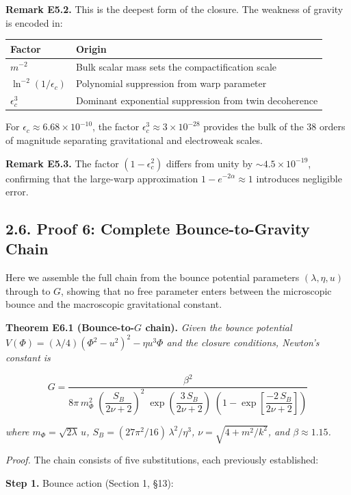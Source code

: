 \documentclass[
  11pt,
]{article}
\begin{document}
\textbf{Remark E5.2.} This is the deepest form of the closure. The
weakness of gravity is encoded in:

\begin{longtable}[]{@{}ll@{}}
\toprule
Factor & Origin\tabularnewline
\midrule
\endhead
\(m^{-2}\) & Bulk scalar mass sets the compactification
scale\tabularnewline
\(\ln^{-2}(1/\epsilon_c)\) & Polynomial suppression from warp
parameter\tabularnewline
\(\epsilon_c^3\) & Dominant exponential suppression from twin
decoherence\tabularnewline
\bottomrule
\end{longtable}

For \(\epsilon_c \approx 6.68 \times 10^{-10}\), the factor
\(\epsilon_c^3 \approx 3 \times 10^{-28}\) provides the bulk of the 38
orders of magnitude separating gravitational and electroweak scales.

\textbf{Remark E5.3.} The factor \((1 - \epsilon_c^2)\) differs from
unity by \(\sim 4.5 \times 10^{-19}\), confirming that the large-warp
approximation \(1 - e^{-2\alpha} \approx 1\) introduces negligible
error.

\bigskip

\hypertarget{proof-6-complete-bounce-to-gravity-chain}{%
\subsection{2.6. Proof 6: Complete Bounce-to-Gravity
Chain}\label{proof-6-complete-bounce-to-gravity-chain}}

Here we assemble the full chain from the bounce potential parameters
\((\lambda, \eta, u)\) through to \(G\), showing that no free parameter
enters between the microscopic bounce and the macroscopic gravitational
constant.

\textbf{Theorem E6.1 (Bounce-to-\(G\) chain).} \emph{Given the bounce
potential \(V(\Phi) = (\lambda/4)(\Phi^2 - u^2)^2 - \eta u^3 \Phi\) and
the closure conditions, Newton's constant is}

\[G = \frac{\beta^2}{8\pi\,m_\Phi^2\;\left(\dfrac{S_B}{2\nu+2}\right)^2\;\exp\!\left(\dfrac{3\,S_B}{2\nu+2}\right)\;\left(1 - \exp\!\left[\dfrac{-2\,S_B}{2\nu+2}\right]\right)} \tag{82}\]

\emph{where \(m_\Phi = \sqrt{2\lambda}\,u\),
\(S_B = (27\pi^2/16)\,\lambda^2/\eta^3\), \(\nu = \sqrt{4 + m^2/k^2}\),
and \(\beta \approx 1.15\).}

\emph{Proof.} The chain consists of five substitutions, each previously
established:

\textbf{Step 1.} Bounce action (Section 1, §13):
\end{document}
